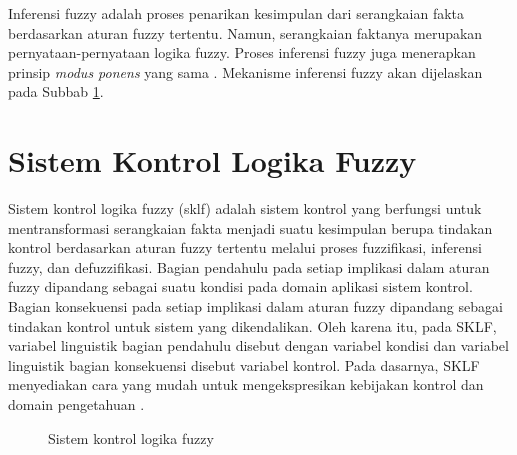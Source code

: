 \noindent Inferensi fuzzy adalah proses penarikan kesimpulan dari serangkaian fakta berdasarkan aturan fuzzy tertentu. Namun, serangkaian faktanya merupakan pernyataan-pernyataan logika fuzzy. Proses inferensi fuzzy juga menerapkan prinsip \emph{modus ponens} yang sama \cite{nedjah}. Mekanisme inferensi fuzzy akan dijelaskan pada Subbab \ref{flc}.

\section{Sistem Kontrol Logika Fuzzy} \label{flc}
\noindent Sistem kontrol logika fuzzy (\gls{sklf}) adalah sistem kontrol yang berfungsi untuk mentransformasi serangkaian fakta menjadi suatu kesimpulan berupa tindakan kontrol berdasarkan aturan fuzzy tertentu melalui proses fuzzifikasi, inferensi fuzzy, dan defuzzifikasi. Bagian pendahulu pada setiap implikasi dalam aturan fuzzy dipandang sebagai suatu kondisi pada domain aplikasi sistem kontrol. Bagian konsekuensi pada setiap implikasi dalam aturan fuzzy dipandang sebagai tindakan kontrol untuk sistem yang dikendalikan. Oleh karena itu, pada SKLF, variabel linguistik bagian pendahulu disebut dengan variabel kondisi dan variabel linguistik bagian konsekuensi disebut variabel kontrol. Pada dasarnya, SKLF menyediakan cara yang mudah untuk mengekspresikan kebijakan kontrol dan domain pengetahuan \cite{fuller}.
\begin{figure}[htbp!]
    \centering
    \caption{Sistem kontrol logika fuzzy}
    \label{fig:flc}
\end{figure}

